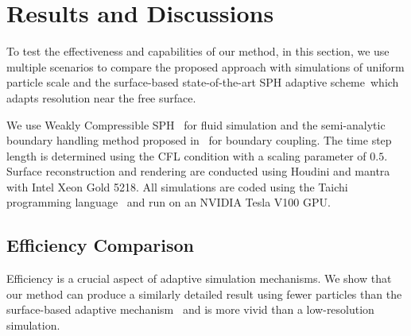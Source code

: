 \documentclass[VANCOUVER,STIX1COL]{WileyNJD-v2}
\providecommand{\DIFadd}[1]{{\protect\color{blue}\uwave{#1}}} %
\providecommand{\DIFaddbegin}{} %
\providecommand{\DIFaddend}{} %
\providecommand{\DIFdelbegin}{} %
\providecommand{\DIFdelend}{} %
\begin{document}
\vspace{-1.5\baselineskip}

\section{Results and Discussions}

\DIFdelbegin %

\DIFdelend To test the effectiveness and capabilities of our method, in this section, we use multiple scenarios to compare the proposed approach with simulations of uniform particle scale and the surface-based state-of-the-art SPH adaptive scheme~\cite{Winchenbach17}\DIFaddbegin \DIFadd{, }\DIFaddend which adapts resolution near the free surface.

We use Weakly Compressible SPH~\cite{Becker07} for fluid simulation and the semi-analytic boundary handling method proposed in~\cite{Winchenbach20} for boundary coupling. The time step length is determined using the CFL condition with a scaling parameter of $0.5$. Surface reconstruction and rendering are conducted using Houdini and mantra with Intel Xeon Gold 5218. All simulations are coded using the Taichi programming language~\cite{hu2019taichi} and run on an NVIDIA Tesla V100 GPU.

\subsection{Efficiency Comparison}

Efficiency is a crucial aspect of adaptive simulation mechanisms. We show that our method can produce a similarly detailed result using fewer particles than the surface-based adaptive mechanism~\cite{Winchenbach17} and is more vivid than a low-resolution simulation. 
\end{document}
